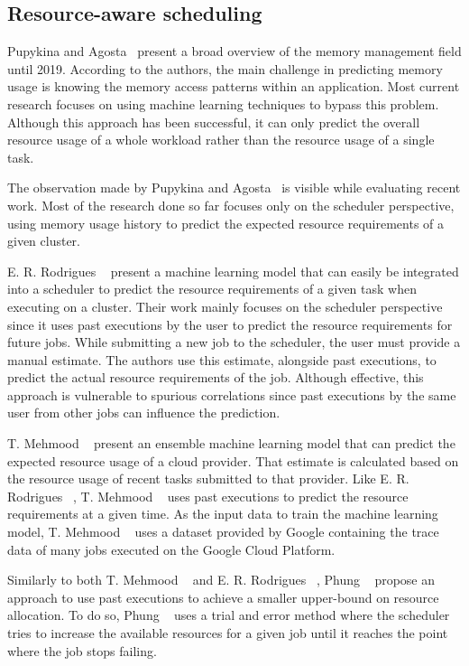 \subsection{Resource-aware scheduling}
\label{subsec:resource-aware-scheduling}

Pupykina and Agosta~\cite{pupykina2019} present a broad overview of the memory management field until 2019.
According to the authors, the main challenge in predicting memory usage is knowing the memory access patterns within an application.
Most current research focuses on using machine learning techniques to bypass this problem.
Although this approach has been successful, it can only predict the overall resource usage of a whole workload rather than the resource usage of a single task.

The observation made by Pupykina and Agosta~\cite{pupykina2019} is visible while evaluating recent work.
Most of the research done so far focuses only on the scheduler perspective, using memory usage history to predict the expected resource requirements of a given cluster.

E. R. Rodrigues \etal~\cite{rodrigues2016} present a machine learning model that can easily be integrated into a scheduler to predict the resource requirements of a given task when executing on a cluster.
Their work mainly focuses on the scheduler perspective since it uses past executions by the user to predict the resource requirements for future jobs.
While submitting a new job to the scheduler, the user must provide a manual estimate.
The authors use this estimate, alongside past executions, to predict the actual resource requirements of the job.
Although effective, this approach is vulnerable to spurious correlations since past executions by the same user from other jobs can influence the prediction.

T. Mehmood \etal~\cite{mehmood2018} present an ensemble machine learning model that can predict the expected resource usage of a cloud provider.
That estimate is calculated based on the resource usage of recent tasks submitted to that provider.
Like E. R. Rodrigues \etal~\cite{rodrigues2016}, T. Mehmood \etal~\cite{mehmood2018} uses past executions to predict the resource requirements at a given time.
As the input data to train the machine learning model, T. Mehmood \etal~\cite{mehmood2018} uses a dataset provided by Google containing the trace data of many jobs executed on the Google Cloud Platform.

Similarly to both T. Mehmood \etal~\cite{mehmood2018} and E. R. Rodrigues \etal~\cite{rodrigues2016}, Phung \etal~\cite{phung2021} propose an approach to use past executions to achieve a smaller upper-bound on resource allocation.
To do so, Phung \etal~\cite{phung2021} uses a trial and error method where the scheduler tries to increase the available resources for a given job until it reaches the point where the job stops failing.

